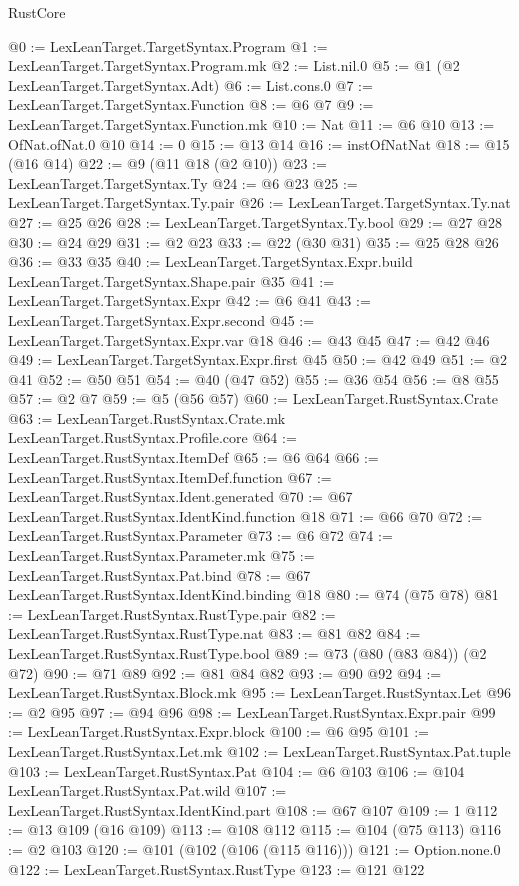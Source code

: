 \begin{lexlean}{RustCore}
\begin{coremodule}
@0 := LexLeanTarget.TargetSyntax.Program
@1 := LexLeanTarget.TargetSyntax.Program.mk
@2 := List.nil.{0}
@5 := @1 (@2 LexLeanTarget.TargetSyntax.Adt)
@6 := List.cons.{0}
@7 := LexLeanTarget.TargetSyntax.Function
@8 := @6 @7
@9 := LexLeanTarget.TargetSyntax.Function.mk
@10 := Nat
@11 := @6 @10
@13 := OfNat.ofNat.{0} @10
@14 := 0
@15 := @13 @14
@16 := instOfNatNat
@18 := @15 (@16 @14)
@22 := @9 (@11 @18 (@2 @10))
@23 := LexLeanTarget.TargetSyntax.Ty
@24 := @6 @23
@25 := LexLeanTarget.TargetSyntax.Ty.pair
@26 := LexLeanTarget.TargetSyntax.Ty.nat
@27 := @25 @26
@28 := LexLeanTarget.TargetSyntax.Ty.bool
@29 := @27 @28
@30 := @24 @29
@31 := @2 @23
@33 := @22 (@30 @31)
@35 := @25 @28 @26
@36 := @33 @35
@40 := LexLeanTarget.TargetSyntax.Expr.build LexLeanTarget.TargetSyntax.Shape.pair @35
@41 := LexLeanTarget.TargetSyntax.Expr
@42 := @6 @41
@43 := LexLeanTarget.TargetSyntax.Expr.second
@45 := LexLeanTarget.TargetSyntax.Expr.var @18
@46 := @43 @45
@47 := @42 @46
@49 := LexLeanTarget.TargetSyntax.Expr.first @45
@50 := @42 @49
@51 := @2 @41
@52 := @50 @51
@54 := @40 (@47 @52)
@55 := @36 @54
@56 := @8 @55
@57 := @2 @7
@59 := @5 (@56 @57)
@60 := LexLeanTarget.RustSyntax.Crate
@63 := LexLeanTarget.RustSyntax.Crate.mk LexLeanTarget.RustSyntax.Profile.core
@64 := LexLeanTarget.RustSyntax.ItemDef
@65 := @6 @64
@66 := LexLeanTarget.RustSyntax.ItemDef.function
@67 := LexLeanTarget.RustSyntax.Ident.generated
@70 := @67 LexLeanTarget.RustSyntax.IdentKind.function @18
@71 := @66 @70
@72 := LexLeanTarget.RustSyntax.Parameter
@73 := @6 @72
@74 := LexLeanTarget.RustSyntax.Parameter.mk
@75 := LexLeanTarget.RustSyntax.Pat.bind
@78 := @67 LexLeanTarget.RustSyntax.IdentKind.binding @18
@80 := @74 (@75 @78)
@81 := LexLeanTarget.RustSyntax.RustType.pair
@82 := LexLeanTarget.RustSyntax.RustType.nat
@83 := @81 @82
@84 := LexLeanTarget.RustSyntax.RustType.bool
@89 := @73 (@80 (@83 @84)) (@2 @72)
@90 := @71 @89
@92 := @81 @84 @82
@93 := @90 @92
@94 := LexLeanTarget.RustSyntax.Block.mk
@95 := LexLeanTarget.RustSyntax.Let
@96 := @2 @95
@97 := @94 @96
@98 := LexLeanTarget.RustSyntax.Expr.pair
@99 := LexLeanTarget.RustSyntax.Expr.block
@100 := @6 @95
@101 := LexLeanTarget.RustSyntax.Let.mk
@102 := LexLeanTarget.RustSyntax.Pat.tuple
@103 := LexLeanTarget.RustSyntax.Pat
@104 := @6 @103
@106 := @104 LexLeanTarget.RustSyntax.Pat.wild
@107 := LexLeanTarget.RustSyntax.IdentKind.part
@108 := @67 @107
@109 := 1
@112 := @13 @109 (@16 @109)
@113 := @108 @112
@115 := @104 (@75 @113)
@116 := @2 @103
@120 := @101 (@102 (@106 (@115 @116)))
@121 := Option.none.{0}
@122 := LexLeanTarget.RustSyntax.RustType
@123 := @121 @122

\end{coremodule}
\end{lexlean}
